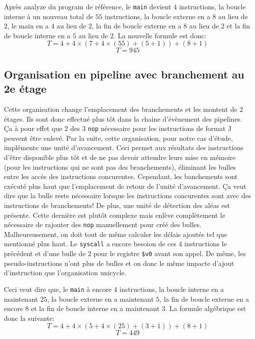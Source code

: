 \documentclass[a11paper]{article}
\begin{document}
Après analyze du program de référence, le \verb|main| devient 4 instructions, la boucle interne à un nouveau total de $55$ instructions, la boucle externe en a $8$ au lieu de $2$,
le main en a $4$ au lieu de $2$, la fin de boucle externe en a $8$ au lieu de $2$ et la fin de boucle interne en a $5$ au lieu de $2$.
La nouvelle formule est donc:
$$
T = 4+ 4\times(7+4\times(55)+(5+1)) + (8+1)
$$
$$
T = 945
$$

\subsection{Organisation en pipeline avec branchement au 2e étage}
Cette organisation change l'emplacement des branchements et les montent de $2$ étages. Ils sont donc effectué plus tôt dans la chaine d'évènement des pipelines. Ça à pour effet que
$2$ des $3$ \verb|nop| nécessaire pour les instructions de format J peuvent être enlevé. Par la suite, cette organisation, pour notre cas d'étude, implémente une unité d'avancement.
Ceci permet aux résultats des instructions d'être disponible plus tôt et de ne pas devoir attendre leurs mise en mémoire (pour les instructions qui ne sont pas des branchements), 
éliminant les bulles entre les accès des instructions concurentes. Cependant, les banchements sont exécuté plus haut que l'emplacement de retour de l'unité d'avancement. Ça veut dire
que la bulle reste nécessaire lorsque les instructions concurentes sont avec des instructions de branchements!
De plus, une unité de détection des aléas est présente. Cette dernière est plutôt complexe mais enlève 
complètement le nécessaire de rajouter des \verb|nop| manuellement pour créé des bulles. Malheureusement, on doit tout de même calculer les délais ajoutés tel que mentionné plus haut.
Le \verb|syscall| a encore besoion de ces $4$ instructions le précédent et d'une bulle de $2$ pour le registre \verb|$v0| avant son appel. De même, les pseudo-instructions n'ont plus
de bulles et on donc le même impacte d'ajout d'instruction que l'organisation unicycle.

Ceci veut dire que, le \verb|main| à encore $4$ instructions, la boucle interne en a maintenant $25$, la boucle externe en a maintenant $5$, la fin de boucle externe en a encore $8$
et la fin de boucle interne en a maintenant $3$. La formule algébrique est donc la suivante:
$$
T = 4+ 4\times(5+4\times(25)+(3+1)) + (8+1)
$$
$$
T = 449
$$
\end{document}
